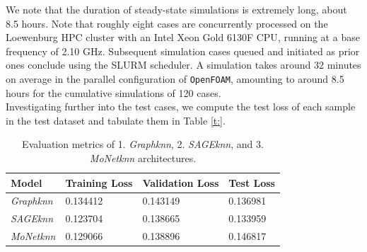 We note that the duration of steady-state simulations is extremely long, about 8.5 hours. Note that roughly eight cases are concurrently processed on the Loewenburg HPC cluster with an Intel Xeon Gold 6130F \gls{CPU}, running at a base frequency of 2.10 GHz. Subsequent simulation cases queued and initiated as prior ones conclude using the \gls{SLURM} scheduler. A simulation takes around 32 minutes on average in the parallel configuration of \verb |OpenFOAM|, amounting to around 8.5 hours for the cumulative simulations of 120 cases. \\
Investigating further into the test cases, we compute the test loss of each sample in the test dataset and tabulate them in Table \ref{t:}.
\begin{table}[ht]
    \centering
    \caption{Evaluation metrics of  1. \textit{Graphknn}, 2. \textit{SAGEknn}, and 3. \textit{MoNetknn} architectures. } 
    \label{t:predloss}
    \begin{tabular}{|l|l|l|l|}
    \hline
    \textbf{Model} & \textbf{Training Loss} & \textbf{Validation Loss} & \textbf{Test Loss}\\
    \hline
     \textit{Graphknn} & 0.134412& 0.143149 & 0.136981   \\
    \hline
    \textit{SAGEknn}& 0.123704 & 0.138665 & 0.133959 \\
    \hline
    \textit{MoNetknn} & 0.129066  & 0.138896 & 0.146817  \\
    \hline
    \end{tabular}
\end{table}
